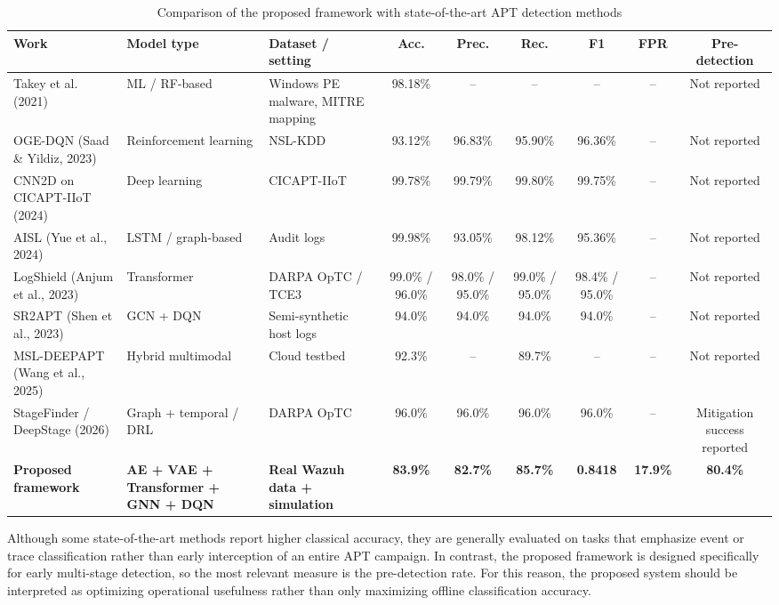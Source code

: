 \begin{table}[H]
\centering
\small
\renewcommand{\arraystretch}{1.2}
\caption{Comparison of the proposed framework with state-of-the-art APT detection methods}
\label{tab:sota-comparison}
\begin{tabular}{p{3.2cm} p{2.1cm} p{2.4cm} c c c c c c}
\hline
\textbf{Work} & \textbf{Model type} & \textbf{Dataset / setting} & \textbf{Acc.} & \textbf{Prec.} & \textbf{Rec.} & \textbf{F1} & \textbf{FPR} & \textbf{Pre-detection} \\
\hline
Takey et al. (2021) & ML / RF-based & Windows PE malware, MITRE mapping & 98.18\% & -- & -- & -- & -- & Not reported \\
OGE-DQN (Saad \& Yildiz, 2023) & Reinforcement learning & NSL-KDD & 93.12\% & 96.83\% & 95.90\% & 96.36\% & -- & Not reported \\
CNN2D on CICAPT-IIoT (2024) & Deep learning & CICAPT-IIoT & 99.78\% & 99.79\% & 99.80\% & 99.75\% & -- & Not reported \\
AISL (Yue et al., 2024) & LSTM / graph-based & Audit logs & 99.98\% & 93.05\% & 98.12\% & 95.36\% & -- & Not reported \\
LogShield (Anjum et al., 2023) & Transformer & DARPA OpTC / TCE3 & 99.0\% / 96.0\% & 98.0\% / 95.0\% & 99.0\% / 95.0\% & 98.4\% / 95.0\% & -- & Not reported \\
SR2APT (Shen et al., 2023) & GCN + DQN & Semi-synthetic host logs & 94.0\% & 94.0\% & 94.0\% & 94.0\% & -- & Not reported \\
MSL-DEEPAPT (Wang et al., 2025) & Hybrid multimodal & Cloud testbed & 92.3\% & -- & 89.7\% & -- & -- & Not reported \\
StageFinder / DeepStage (2026) & Graph + temporal / DRL & DARPA OpTC & 96.0\% & 96.0\% & 96.0\% & 96.0\% & -- & Mitigation success reported \\
\textbf{Proposed framework} & \textbf{AE + VAE + Transformer + GNN + DQN} & \textbf{Real Wazuh data + simulation} & \textbf{83.9\%} & \textbf{82.7\%} & \textbf{85.7\%} & \textbf{0.8418} & \textbf{17.9\%} & \textbf{80.4\%} \\
\hline
\end{tabular}
\end{table}

Although some state-of-the-art methods report higher classical accuracy, they are generally evaluated on tasks that emphasize event or trace classification rather than early interception of an entire APT campaign. In contrast, the proposed framework is designed specifically for early multi-stage detection, so the most relevant measure is the pre-detection rate. For this reason, the proposed system should be interpreted as optimizing operational usefulness rather than only maximizing offline classification accuracy.

